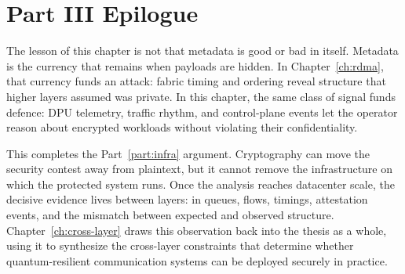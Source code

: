 

\section{Part III Epilogue}
\label{sec:conf-discussion}

The lesson of this chapter is not that metadata is good or bad in itself. Metadata is the currency that remains when payloads are hidden. In Chapter~\ref{ch:rdma}, that currency funds an attack: fabric timing and ordering reveal structure that higher layers assumed was private. In this chapter, the same class of signal funds defence: DPU telemetry, traffic rhythm, and control-plane events let the operator reason about encrypted workloads without violating their confidentiality.

This completes the Part~\ref{part:infra} argument. Cryptography can move the security contest away from plaintext, but it cannot remove the infrastructure on which the protected system runs. Once the analysis reaches datacenter scale, the decisive evidence lives between layers: in queues, flows, timings, attestation events, and the mismatch between expected and observed structure. Chapter~\ref{ch:cross-layer} draws this observation back into the thesis as a whole, using it to synthesize the cross-layer constraints that determine whether quantum-resilient communication systems can be deployed securely in practice.